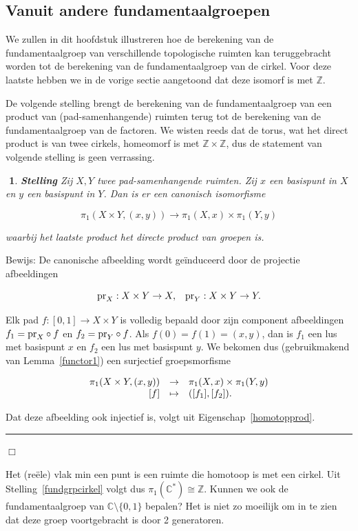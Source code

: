 \documentclass[12pt]{book}
\newcommand{\Z}{\mathbb{Z}}
\newcommand{\bew}{{\sc Bewijs: }}
\newcommand{\B}{\rule{1mm}{0mm} \hfill $\Box$ }
\newcommand{\C}{\mathbb{C}}
\newtheorem{stelh}{$\!\!$}[section]
\newenvironment{stel}{\begin{stelh}{\em {\bf Stelling }}}{\end{stelh}}
\begin{document}
\subsection{Vanuit andere fundamentaalgroepen}

We zullen in dit hoofdstuk illustreren hoe de berekening van de fundamentaalgroep van verschillende topo\-logische ruimten kan teruggebracht worden tot de berekening van de fundamentaalgroep van de cirkel. Voor deze laatste hebben we in de vorige sectie aangetoond dat deze isomorf is met $\Z$.

De volgende stelling brengt de berekening van de fundamentaalgroep van een product van
(pad-samenhangende) ruimten terug tot de berekening van de fundamentaalgroep van de factoren. We wisten reeds dat de torus, wat het direct product is van twee cirkels, homeomorf is met $\Z\times \Z$, dus de statement van volgende stelling is geen verrassing.



\begin{stel}
Zij $X,Y$ twee pad-samenhangende ruimten. Zij $x$ een basispunt in $X$ en $y$ een basispunt in $Y$.
Dan is er een canonisch isomorfisme

$$\pi_{1}(X\times Y, (x,y)) \to \pi_{1}(X,x)\times \pi_{1}(Y,y)$$

waarbij het laatste product het directe product van groepen is.
\end{stel}

\bew De canonische afbeelding wordt ge\"{i}nduceerd door de projectie afbeeldingen 

$${\rm pr}_{X}:X\times Y\to X, \;\;\; {\rm pr}_{Y}:X\times Y \to Y.$$ 

Elk pad $f:[0,1]\to X \times Y$ is volledig bepaald door
zijn component afbeeldingen $f_1= {\rm pr}_{X}\circ f$ en $f_2={\rm pr}_{Y}\circ f$. Als
$f(0)=f(1)=(x,y)$, dan is $f_1$ een lus met basispunt $x$ en $f_2$ een lus met basispunt $y$.
We bekomen dus (gebruikmakend van Lemma~\ref{functor1}) een surjectief groepsmorfisme

$$\begin{array}{rcl}
\pi_{1}(X\times Y, (x,y)) & \to & \pi_{1}(X,x)\times \pi_{1}(Y,y)\\
\rule{0mm}{0mm} [f] & \mapsto & ([f_1], [f_2]).\end{array}$$

Dat deze afbeelding ook injectief is, volgt uit Eigenschap~\ref{homotopprod}.  \B

\bigskip
Het (re\"{e}le) vlak min een punt is een ruimte die homotoop is met een cirkel. Uit Stelling~\ref{fundgrpcirkel} volgt dus $\pi_1(\C^*)\cong \Z$. Kunnen we ook de fundamentaalgroep van $\C\setminus \{0,1\}$ bepalen? Het is niet zo moeilijk om in
te zien dat deze groep voortgebracht is door 2 generatoren. 
\end{document}
